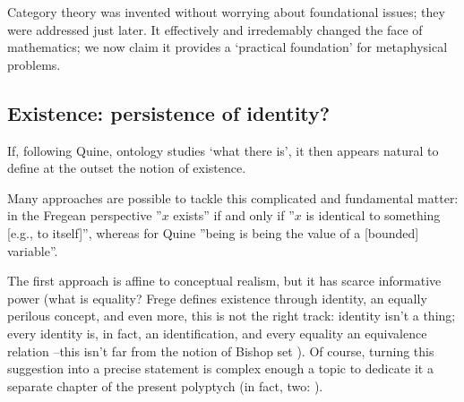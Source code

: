 Category theory was invented without worrying about foundational issues; they were addressed just later. It effectively and irredemably changed the face of mathematics; we now claim it provides a `practical foundation' for metaphysical problems.%
\subsection{Existence: persistence of identity?} \label{existence}
If, following Quine, ontology studies `what there is', it then appears natural to define at the outset the notion of existence.

Many approaches are possible to tackle this complicated and fundamental matter: in the Fregean perspective \cite{Frege} ''$x$ exists'' if and only if ''$x$ is identical to something [e.g., to itself]'', whereas for Quine \cite{Qui53} ''being is being the value of a [bounded] variable''.

The first approach is affine to conceptual realism, but it has scarce informative power (what is equality? Frege defines existence through identity, an equally perilous concept, and even more, this is not the right track: identity isn't a thing; every identity is, in fact, an identification, and every equality an equivalence relation --this isn't far from the notion of Bishop set \cite{Bis67,hofmann2012extensional}). Of course, turning this suggestion into a precise statement is complex enough a topic to dedicate it a separate chapter of the present polyptych (in fact, two: \cite{black,homot}).

